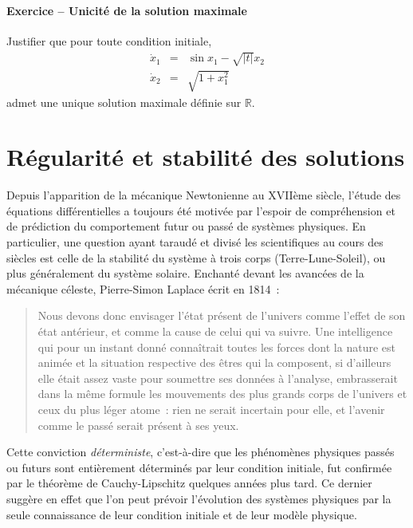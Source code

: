 \hypertarget{ini_sol}{%
\subsubsection*{\texorpdfstring{Exercice -- Unicité de la solution maximale
}{Exercice -- Unicité de la solution maximale}}\label{ini_sol}}


Justifier que pour toute condition initiale,
\[
\begin{array}{rcl}
\dot{x}_1 &=& \sin x_1 - \sqrt{|t|} x_2 \\
\dot{x}_2 &=& \sqrt{1+x_1^2}
\end{array}
\] admet une unique solution maximale définie sur \(\mathbb{R}\).

\hypertarget{ruxe9gularituxe9-et-stabilituxe9-des-solutions}{%
\chapter{Régularité et stabilité des
solutions}\label{ruxe9gularituxe9-et-stabilituxe9-des-solutions}}

Depuis l'apparition de la mécanique Newtonienne au XVIIème siècle,
l'étude des équations différentielles a toujours
été motivée par l'espoir de compréhension et de prédiction du
comportement futur ou passé de systèmes physiques. En particulier, une
question ayant taraudé et divisé les scientifiques au cours des siècles
est celle de la stabilité du système à trois corps (Terre-Lune-Soleil),
ou plus généralement du système solaire. Enchanté devant les avancées de
la mécanique céleste, Pierre-Simon Laplace écrit en 1814~:

\begin{quote}
Nous devons donc envisager l'état présent de l'univers comme l'effet de
son état antérieur, et comme la cause de celui qui va suivre. Une
intelligence qui pour un instant donné connaîtrait toutes les forces
dont la nature est animée et la situation respective des êtres qui la
composent, si d'ailleurs elle était assez vaste pour soumettre ses
données à l'analyse, embrasserait dans la même formule les mouvements
des plus grands corps de l'univers et ceux du plus léger atome~: rien ne
serait incertain pour elle, et l'avenir comme le passé serait présent à
ses yeux.
\end{quote}

Cette conviction \emph{déterministe}, c'est-à-dire que les phénomènes
physiques passés ou futurs sont entièrement déterminés par leur
condition initiale, fut confirmée par le théorème de Cauchy-Lipschitz
quelques années plus tard. Ce dernier suggère en effet que l'on peut
prévoir l'évolution des systèmes physiques par la seule connaissance de
leur condition initiale et de leur modèle physique.

